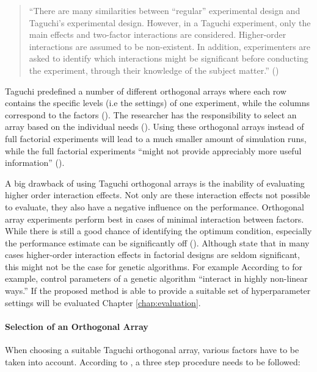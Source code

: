 \begin{quote}
	\begin{em}
		\enquote{There are many similarities between “regular” experimental design and Taguchi's experimental design. However, in a Taguchi experiment, only the main effects and two-factor interactions are considered. Higher-order interactions are assumed to be non-existent. In addition, experimenters are asked to identify which interactions might be significant before conducting the experiment, through their knowledge of the subject matter.} (\cite{yang_design_2009})
	\end{em}
\end{quote}

Taguchi predefined a number of different orthogonal arrays where each row contains the specific levels (i.e the settings) of one experiment, while the columns correspond to the factors (\cite{li_taguchi_2021}). The researcher has the responsibility to select an array based on the individual needs (\cite{li_taguchi_2021}).
Using these orthogonal arrays instead of full factorial experiments will lead to a much smaller amount of simulation runs, while the full factorial experiments \enquote{might not provide appreciably more useful information} (\cite{roy_primer_1990}).

A big drawback of using Taguchi orthogonal arrays is the inability of evaluating higher order interaction effects. Not only are these interaction effects not possible to evaluate, they also have a negative influence on the performance. Orthogonal array experiments perform best in cases of minimal interaction between factors. While there is still a good chance of identifying the optimum condition, especially the performance estimate can be significantly off (\cite{roy_primer_1990}). Although \cite{yang_design_2009} state that in many cases higher-order interaction effects in factorial designs are seldom significant, this might not be the case for genetic algorithms. For example According to \cite{kacprzyk_parameter_2007} for example, control parameters of a genetic algorithm \enquote{interact in highly non-linear ways.} If the proposed method is able to provide a suitable set of hyperparameter settings will be evaluated Chapter \ref{chap:evaluation}.

\paragraph{Selection of an Orthogonal Array}
When choosing a suitable Taguchi orthogonal array, various factors have to be taken into account. According to \cite{yang_design_2009}, a three step procedure needs to be followed:


